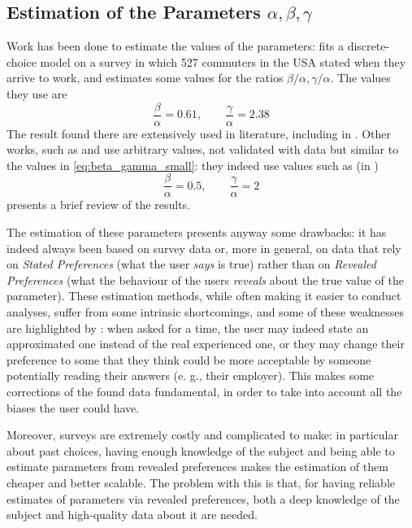 \subsection{Estimation of the Parameters $\alpha, \beta, \gamma$}
\label{sec:estim-param-alpha}

Work has been done to estimate the values of the parameters:
\textcite{54d203ee-4bf8-3234-9286-56e4c8b7f5bd} fits a discrete-choice model on a survey in which 527 commuters in the USA stated when they arrive to work, and estimates some values for the ratios \(\beta/\alpha, \gamma/\alpha\).
The values they use are
\begin{equation}
  \label{eq:beta_gamma_small}
  \frac{\beta}{\alpha} = 0.61,\qquad \frac{\gamma}{\alpha} = 2.38
\end{equation}
The result found there are extensively used in literature, including in \textcite{d0907f84-e14a-3d98-ad20-759f41491d6e}.
Other works, such as \textcite{doi:10.3141/1807-04} and \textcite{4ffb5da1-1f49-3898-98a7-209781744dc0} use arbitrary values,
not validated with data but similar to the values in \eqref{eq:beta_gamma_small}:
they indeed use values such as (in \cite{4ffb5da1-1f49-3898-98a7-209781744dc0})
\begin{equation}
  \label{eq:beta_gamma_vickrey}
  \frac{\beta}{\alpha} = 0.5,\qquad \frac{\gamma}{\alpha} = 2
\end{equation}
\textcite{https://doi.org/10.1111/iere.12692} presents a brief review of the results.

The estimation of these parameters presents anyway some drawbacks:
it has indeed always been based on survey data or,
more in general, on data that rely on \textit{Stated Preferences} (what the user \textit{says} is true)
rather than on \textit{Revealed Preferences} (what the behaviour of the users \textit{reveals} about the true value of the parameter).
These estimation methods, while often making it easier to conduct analyses,
suffer from some intrinsic shortcomings,
and some of these weaknesses are highlighted by \textcite{54d203ee-4bf8-3234-9286-56e4c8b7f5bd}:
when asked for a time, the user may indeed state an approximated one instead of the real experienced one,
or they may change their preference to some that they think could be more acceptable by someone potentially reading their answers (e. g., their employer).
This makes some corrections of the found data fundamental,
in order to take into account all the biases the user could have.

Moreover, surveys are extremely costly and complicated to make:
in particular about past choices, having enough knowledge of the subject
and being able to estimate parameters from revealed preferences
makes the estimation of them cheaper and better scalable.
The problem with this is that,
for having reliable estimates of parameters via revealed preferences,
both a deep knowledge of the subject and high-quality data about it are needed.

